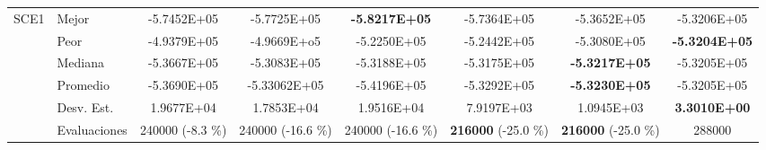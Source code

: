 \begin{table}
{\begin{tabular}{clcccccc}
			
			
			
			
			\hline
			\multirow{6}{*}{SCE1} & Mejor       & -5.7452E+05    & -5.7725E+05    & \textbf{-5.8217E+05}   &-5.7364E+05   & -5.3652E+05   &-5.3206E+05 \\
			& Peor        &-4.9379E+05     & -4.9669E+o5   & -5.2250E+05   & -5.2442E+05  & -5.3080E+05  & \textbf{-5.3204E+05} \\
			& Mediana     &-5.3667E+05    &-5.3083E+05   & -5.3188E+05   & -5.3175E+05   & \textbf{-5.3217E+05}  & -5.3205E+05   \\
			& Promedio    &-5.3690E+05   &-5.33062E+05   & -5.4196E+05   & -5.3292E+05   & \textbf{-5.3230E+05 }  & -5.3205E+05 \\
			& Desv. Est.  &1.9677E+04  & 1.7853E+04    & 1.9516E+04   & 7.9197E+03   & 1.0945E+03  & \textbf{3.3010E+00 } \\
			& Evaluaciones&240000 (-8.3 \%) & 240000 (-16.6 \%)  & 240000 (-16.6 \%)   & \textbf{216000} (-25.0 \%) & \textbf{216000} (-25.0 \%)&288000
			
			
			
			
			
		\end{tabular}
	}
\end{table}


